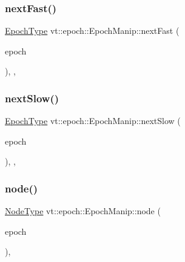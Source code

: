 \subsubsection{\texorpdfstring{next\+Fast()}{nextFast()}}
{\footnotesize\ttfamily \hyperlink{namespacevt_a985a5adf291c34a3ca263b3378388236}{Epoch\+Type} vt\+::epoch\+::\+Epoch\+Manip\+::next\+Fast (\begin{DoxyParamCaption}\item[{\hyperlink{namespacevt_a985a5adf291c34a3ca263b3378388236}{Epoch\+Type} const \&}]{epoch }\end{DoxyParamCaption})\hspace{0.3cm}{\ttfamily [inline]}, {\ttfamily [static]}, {\ttfamily [private]}}

\mbox{\label{structvt_1_1epoch_1_1_epoch_manip_a507bb5b29e034df10e1f8e12b920e666}} 
\subsubsection{\texorpdfstring{next\+Slow()}{nextSlow()}}
{\footnotesize\ttfamily \hyperlink{namespacevt_a985a5adf291c34a3ca263b3378388236}{Epoch\+Type} vt\+::epoch\+::\+Epoch\+Manip\+::next\+Slow (\begin{DoxyParamCaption}\item[{\hyperlink{namespacevt_a985a5adf291c34a3ca263b3378388236}{Epoch\+Type} const \&}]{epoch }\end{DoxyParamCaption})\hspace{0.3cm}{\ttfamily [inline]}, {\ttfamily [static]}, {\ttfamily [private]}}

\mbox{\label{structvt_1_1epoch_1_1_epoch_manip_a7120f73ef583ab8f061334fc0bc519c3}} 
\subsubsection{\texorpdfstring{node()}{node()}}
{\footnotesize\ttfamily \hyperlink{namespacevt_a866da9d0efc19c0a1ce79e9e492f47e2}{Node\+Type} vt\+::epoch\+::\+Epoch\+Manip\+::node (\begin{DoxyParamCaption}\item[{\hyperlink{namespacevt_a985a5adf291c34a3ca263b3378388236}{Epoch\+Type} const \&}]{epoch }\end{DoxyParamCaption})\hspace{0.3cm}{\ttfamily [inline]}, {\ttfamily [static]}}




